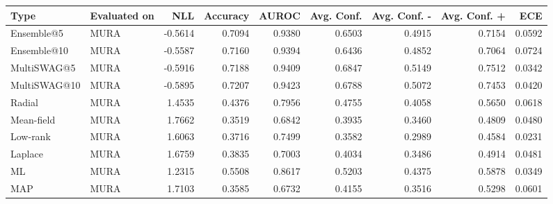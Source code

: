\begin{tabular}{llrrrrrrr}
\toprule
        Type & Evaluated on &     NLL &  Accuracy &  AUROC &  Avg. Conf. &  Avg. Conf. - &  Avg. Conf. + &    ECE \\
\midrule
  Ensemble@5 &         MURA & -0.5614 &    0.7094 & 0.9380 &      0.6503 &        0.4915 &        0.7154 & 0.0592 \\
 Ensemble@10 &         MURA & -0.5587 &    0.7160 & 0.9394 &      0.6436 &        0.4852 &        0.7064 & 0.0724 \\
 MultiSWAG@5 &         MURA & -0.5916 &    0.7188 & 0.9409 &      0.6847 &        0.5149 &        0.7512 & 0.0342 \\
MultiSWAG@10 &         MURA & -0.5895 &    0.7207 & 0.9423 &      0.6788 &        0.5072 &        0.7453 & 0.0420 \\
      Radial &         MURA &  1.4535 &    0.4376 & 0.7956 &      0.4755 &        0.4058 &        0.5650 & 0.0618 \\
  Mean-field &         MURA &  1.7662 &    0.3519 & 0.6842 &      0.3935 &        0.3460 &        0.4809 & 0.0480 \\
    Low-rank &         MURA &  1.6063 &    0.3716 & 0.7499 &      0.3582 &        0.2989 &        0.4584 & 0.0231 \\
     Laplace &         MURA &  1.6759 &    0.3835 & 0.7003 &      0.4034 &        0.3486 &        0.4914 & 0.0481 \\
          ML &         MURA &  1.2315 &    0.5508 & 0.8617 &      0.5203 &        0.4375 &        0.5878 & 0.0349 \\
         MAP &         MURA &  1.7103 &    0.3585 & 0.6732 &      0.4155 &        0.3516 &        0.5298 & 0.0601 \\
\bottomrule
\end{tabular}
